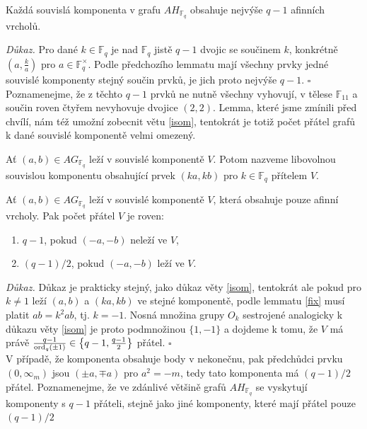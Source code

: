 \documentclass[12pt]{report}
\begin{document}
\begin{dusledek}\label{fixab}
Každá souvislá komponenta v grafu $AH_{\mathbb{F}_q}$ obsahuje nejvýše $q-1$ afinních vrcholů.
\end{dusledek}
\noindent \textit{Důkaz.} Pro dané $k \in \mathbb{F}_q$ je nad $\mathbb{F}_q$ jistě $q-1$ dvojic se součinem $k$, konkrétně $\left(a, \frac{k}{a}\right)$ pro $a \in \mathbb{F}_q ^{\times}$. Podle předchozího lemmatu mají všechny prvky jedné souvislé komponenty stejný součin prvků, je jich proto nejvýše $q-1$. \hfill $\square$\\

Poznamenejme, že z těchto $q-1$ prvků ne nutně všechny vyhovují, v tělese $\mathbb{F}_{11}$ a součin roven čtyřem nevyhovuje dvojice $(2,2)$. Lemma, které jsme zmínili před chvílí, nám též umožní zobecnit větu \ref{isom}, tentokrát je totiž počet přátel grafů k dané souvislé komponentě velmi omezený.
\begin{definice}
Ať $(a,b) \in AG_{\mathbb{F}_q}$ leží v souvislé komponentě $V$. Potom nazveme libovolnou souvislou komponentu obsahující prvek $(ka,kb)$ pro $k \in \mathbb{F}_q$ přítelem $V$.
\end{definice}

\begin{veta}
Ať $(a,b) \in AG_{\mathbb{F}_q}$ leží v souvislé komponentě $V$, která obsahuje pouze afinní vrcholy. Pak počet přátel $V$ je roven:
\begin{enumerate}
\item $q-1$, pokud $(-a,-b)$ neleží ve $V$,
\item $(q-1)/2$, pokud $(-a,-b)$ leží ve $V$.
\end{enumerate} 
\end{veta}
\noindent \textit{Důkaz.} Důkaz je prakticky stejný, jako důkaz věty \ref{isom}, tentokrát ale pokud pro $k \neq 1$ leží $(a,b)$ a $(ka,kb)$ ve stejné komponentě, podle lemmatu \ref{fix} musí platit $a b = k^2 ab$, tj. $k = - 1$. Nosná množina grupy $O_{k}$ sestrojené analogicky k důkazu věty \ref{isom} je proto podmnožinou $\lbrace 1,-1 \rbrace$ a dojdeme k tomu, že  $V$ má právě $\frac{q-1}{\operatorname{ord}_q (\pm 1)} \in  \left\lbrace q-1,\frac{q-1}{2}\right\rbrace$ přátel. \hfill $\square$\\

V případě, že komponenta obsahuje body v nekonečnu, pak předchůdci prvku $(0,\infty_m)$ jsou $(\pm a,\mp a)$ pro $a^2 = -m$, tedy tato komponenta má $(q-1)/2$ přátel. Poznamenejme, že ve zdánlivé většině grafů $AH_{\mathbb{F}_q}$ se vyskytují komponenty s $q-1$ přáteli, stejně jako jiné komponenty, které mají přátel pouze $(q-1)/2$
\end{document}
